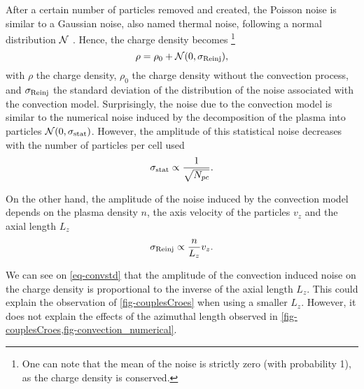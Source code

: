     After a certain number of particles removed and created, the Poisson noise is similar to a Gaussian noise, also named thermal noise, following a normal distribution $\mathcal{N}$ . 
    Hence, the charge density becomes \footnote{One can note that the mean of the noise is strictly zero (with probability 1), as the charge density is conserved.}
    \begin{equation} \label{eq-rhonoise}
      \rho = \rho_0 + \mathcal{N}(0, \sigma_{\rm Reinj}),
    \end{equation}
    with $\rho$ the charge density, $\rho_0$ the charge density without the convection process, and $\sigma_{\rm Reinj}$ the standard deviation of the distribution of the noise associated with the convection model.
    Surprisingly, the noise due to the convection model is similar to the numerical noise induced by the decomposition of the plasma into particles $\mathcal{N}(0, \sigma_{\rm stat})$.
    However, the amplitude of this statistical noise decreases with the number of particles per cell used
    \begin{equation*} \label{eq-statistical}
     \sigma_{\rm stat} \propto \frac{1}{\sqrt{N_{pc}}}.
    \end{equation*}

    On the other hand, the amplitude of the noise induced by the convection model depends on the plasma density $n$, the axis velocity of the particles $v_z$ and the axial length $L_z$
    \begin{equation} \label{eq-convstd}
     \sigma_{\rm Reinj} \propto \frac{n}{L_z} v_z.
    \end{equation}

    We can see on \cref{eq-convstd} that the amplitude of the convection induced noise on the charge density is proportional to the inverse of the axial length $L_z$.
    This could explain the observation of \cref{fig-couplesCroes} when using a smaller $L_z$.
    However, it does not explain the effects of the azimuthal length observed in \cref{fig-couplesCroes,fig-convection_numerical}.

